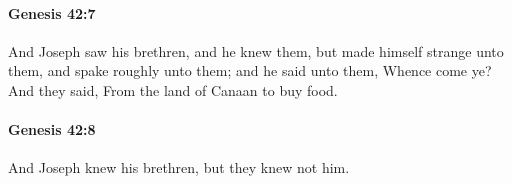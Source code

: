 		\paragraph{Genesis 42:7} %
			\label{GENESIS-42-7}

			And Joseph saw his brethren, and he knew them, but made himself strange unto them, and spake roughly unto them; and he said unto them, Whence come ye? And they said, From the land of Canaan to buy food.


		\paragraph{Genesis 42:8} %
			\label{GENESIS-42-8}

			And Joseph knew his brethren, but they knew not him.


